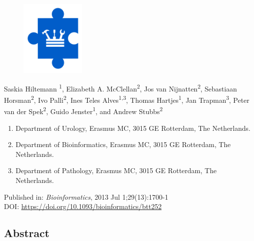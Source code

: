 \setcounter{NAT@ctr}{-1}
\chapter*{}

\begin{figure}[t!]
\centering
\includegraphics[height=10em]{frontmatter/images/chapter-header-tools.png}
\end{figure}
\vspace{-4cm}

\label{chapter:ifuse}
Saskia Hiltemann \textsuperscript{1}, Elizabeth A. McClellan\textsuperscript{2}, Jos van Nijnatten\textsuperscript{2}, Sebastiaan Horsman\textsuperscript{2}, Ivo Palli\textsuperscript{2}, Ines Teles Alves\textsuperscript{1,3}, Thomas Hartjes\textsuperscript{1}, Jan Trapman\textsuperscript{3}, Peter van der Spek\textsuperscript{2}, Guido Jenster\textsuperscript{1}, and Andrew Stubbs\textsuperscript{2}

\small
\begin{enumerate}
\itemsep-0.5em
\item Department of Urology, Erasmus MC, 3015 GE Rotterdam, The Netherlands.
\item Department of Bioinformatics, Erasmus MC, 3015 GE Rotterdam, The Netherlands.
\item Department of Pathology, Erasmus MC, 3015 GE Rotterdam, The Netherlands.
\end{enumerate}

Published in: \emph{Bioinformatics}, 2013 Jul 1;29(13):1700-1 \\
DOI: \url{https://doi.org/10.1093/bioinformatics/btt252} \\

\section*{Abstract}

